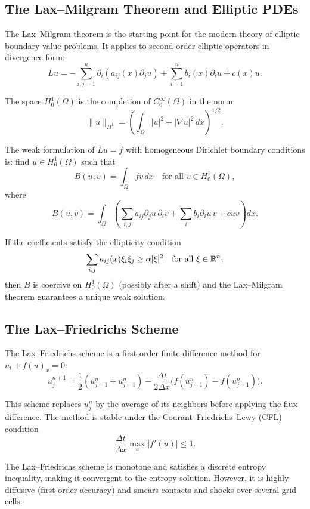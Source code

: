 \subsection{The Lax--Milgram Theorem and Elliptic PDEs}

The Lax--Milgram theorem is the starting point for the modern theory of elliptic boundary-value problems. It applies to second-order elliptic operators in divergence form:
\[
Lu = -\sum_{i,j=1}^n \partial_i (a_{ij}(x) \partial_j u) + \sum_{i=1}^n b_i(x) \partial_i u + c(x) u.
\]

\begin{definition}
The space \(H_0^1(\Omega)\) is the completion of \(C_0^\infty(\Omega)\) in the norm
\[
\|u\|_{H^1} = \left(\int_\Omega |u|^2 + |\nabla u|^2 \,dx\right)^{1/2}.
\]
\end{definition}

The weak formulation of \(Lu = f\) with homogeneous Dirichlet boundary conditions is: find \(u \in H_0^1(\Omega)\) such that
\[
B(u,v) = \int_\Omega f v \,dx \quad \text{for all } v \in H_0^1(\Omega),
\]
where
\[
B(u,v) = \int_\Omega \left(\sum_{i,j} a_{ij} \partial_j u \,\partial_i v + \sum_i b_i \partial_i u \, v + c u v\right) dx.
\]

If the coefficients satisfy the ellipticity condition
\[
\sum_{i,j} a_{ij}(x) \xi_i \xi_j \geq \alpha |\xi|^2 \quad \text{for all } \xi \in \mathbb{R}^n,
\]
then \(B\) is coercive on \(H_0^1(\Omega)\) (possibly after a shift) and the Lax--Milgram theorem guarantees a unique weak solution.

\subsection{The Lax--Friedrichs Scheme}

The Lax--Friedrichs scheme is a first-order finite-difference method for \(u_t + f(u)_x = 0\):
\[
u_j^{n+1} = \frac12 (u_{j+1}^n + u_{j-1}^n) - \frac{\Delta t}{2\Delta x}\bigl(f(u_{j+1}^n) - f(u_{j-1}^n)\bigr).
\]

This scheme replaces \(u_j^n\) by the average of its neighbors before applying the flux difference. The method is stable under the Courant--Friedrichs--Lewy (CFL) condition
\[
\frac{\Delta t}{\Delta x} \max_u |f'(u)| \leq 1.
\]

The Lax--Friedrichs scheme is monotone and satisfies a discrete entropy inequality, making it convergent to the entropy solution. However, it is highly diffusive (first-order accuracy) and smears contacts and shocks over several grid cells.

